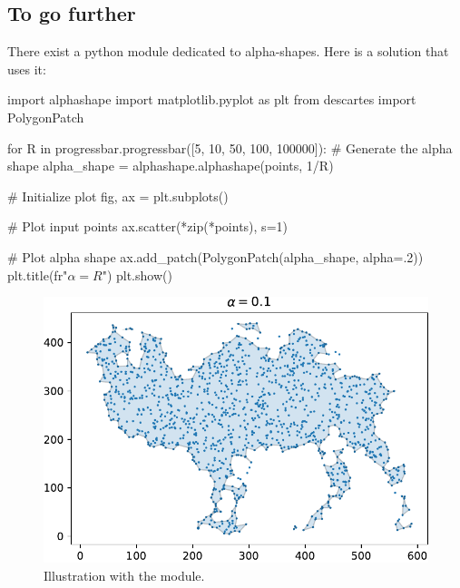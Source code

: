 \begin{pcomment}
\subsection{To go further}

There exist a python module dedicated to alpha-shapes. Here is a solution that uses it:

\begin{python}
import alphashape
import matplotlib.pyplot as plt
from descartes import PolygonPatch
\end{python}

\begin{python}
for R in progressbar.progressbar([5, 10, 50, 100, 100000]):
    # Generate the alpha shape
    alpha_shape = alphashape.alphashape(points, 1/R)

    # Initialize plot
    fig, ax = plt.subplots()

    # Plot input points
    ax.scatter(*zip(*points), s=1)

    # Plot alpha shape
    ax.add_patch(PolygonPatch(alpha_shape, alpha=.2))
    plt.title(fr"$\alpha={R}$")
    plt.show()
\end{python}

\begin{figure}[htbp]
 \centering 
 \includegraphics[width=.7\linewidth]{module_alphashape_10.python.pdf}
 \caption{Illustration with the  module.}
\end{figure}

\end{pcomment}
